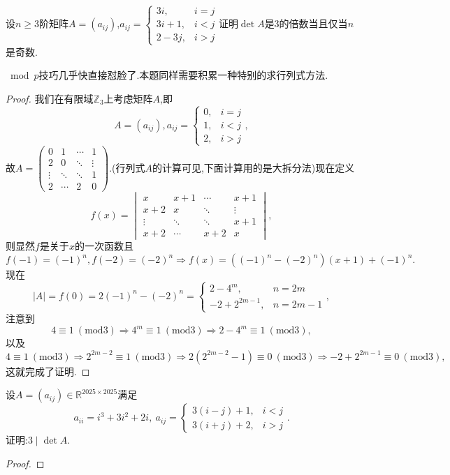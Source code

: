 \documentclass[../../main.tex]{subfiles}
\begin{document}
\begin{example}
设\( n \geqslant 3 \)阶矩阵\( A = (a_{ij}) \),\( a_{ij} = \begin{cases}
3i, & i = j \\
3i + 1, & i < j \\
2 - 3j, & i > j
\end{cases} \)证明\( \det A \)是3的倍数当且仅当\( n \)是奇数.
\end{example}
\begin{note}
\(\bmod p\)技巧几乎快直接怼脸了.本题同样需要积累一种特别的求行列式方法.
\end{note}
\begin{proof}
我们在有限域\( \mathbb{Z}_3 \)上考虑矩阵\( A \),即
\[
A = (a_{ij}),a_{ij} = \begin{cases}
0, & i = j \\
1, & i < j \\
2, & i > j
\end{cases},
\]
故\( A = \begin{pmatrix}
0 & 1 & \cdots & 1 \\
2 & 0 & \ddots & \vdots \\
\vdots & \ddots & \ddots & 1 \\
2 & \cdots & 2 & 0
\end{pmatrix} \).(行列式$A$的计算可见,下面计算用的是大拆分法)现在定义
\[
f(x) = \begin{vmatrix}
x & x + 1 & \cdots & x + 1 \\
x + 2 & x & \ddots & \vdots \\
\vdots & \ddots & \ddots & x + 1 \\
x + 2 & \cdots & x + 2 & x
\end{vmatrix},
\]
则显然\( f \)是关于\( x \)的一次函数且
\[
f(-1) = (-1)^n,f(-2) = (-2)^n \Rightarrow f(x) = ((-1)^n - (-2)^n)(x + 1) + (-1)^n.
\]
现在
\[
|A| = f(0) = 2(-1)^n - (-2)^n = \begin{cases}
2 - 4^m, & n = 2m \\
-2 + 2^{2m - 1}, & n = 2m - 1
\end{cases},
\]
注意到
\[
4 \equiv 1\ (\text{mod}3) \Rightarrow 4^m \equiv 1\ (\text{mod}3) \Rightarrow 2 - 4^m \equiv 1\ (\text{mod}3),
\]
以及
\[
4 \equiv 1\ (\text{mod}3) \Rightarrow 2^{2m - 2} \equiv 1\ (\text{mod}3) \Rightarrow 2(2^{2m - 2} - 1) \equiv 0\ (\text{mod}3) \Rightarrow -2 + 2^{2m - 1} \equiv 0\ (\text{mod}3),
\]
这就完成了证明.
\end{proof}

\begin{example}
设$A = (a_{ij}) \in \mathbb{R}^{2025 \times 2025}$满足
\[
a_{ii} = i^3 + 3i^2 + 2i, \ a_{ij} = \begin{cases}
3(i - j) + 1, & i < j \\
3(i + j) + 2, & i > j
\end{cases}.
\]
证明:$3 \mid \det A$.
\end{example}
\begin{proof}

\end{proof}
\end{document}
